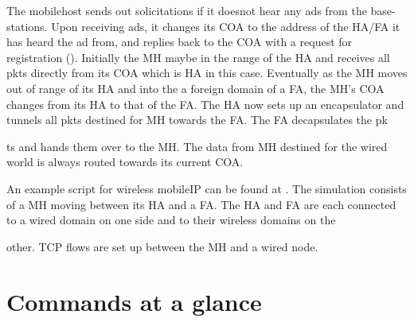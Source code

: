 {The mobilehost sends out solicitations if it doesnot hear any ads from the
base-stations. Upon receiving ads, it changes its COA to the address of
the HA/FA it has heard the ad from, and replies back to the COA with a
request for registration ().
Initially the MH maybe in the range of the HA and receives all pkts directly from its COA which is HA in this case.
Eventually as the MH moves out of range of its HA and into the a foreign domain of a FA, the MH's COA changes from its HA to that of the FA. The HA now sets up an encapsulator and tunnels all pkts destined for MH towards the FA. The FA decapsulates the pk











ts and hands them over to the MH. The data from MH destined for the wired world is always routed towards its current COA.

An example script for wireless mobileIP can be found at . The simulation consists of a MH moving between its HA and a FA. The HA and FA are each connected to a wired domain on one side and to their wireless domains on the











 other. TCP flows are set up between the MH and a wired node. 

\section{Commands at a glance}
\label{sec:wirelesscommand}

}
